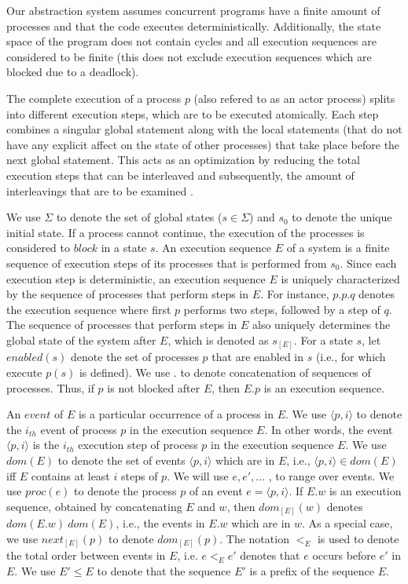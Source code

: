 Our abstraction system assumes concurrent programs have a finite amount of processes and that
the code executes deterministically. Additionally, the state space of the program does not
contain cycles and all execution sequences are considered to be finite (this does not exclude
execution sequences which are blocked due to a deadlock).

The complete execution of a process $p$ (also refered to as an actor process) splits into different execution steps, which are to be 
executed atomically. Each step combines a singular global statement along with the local statements
(that do not have any explicit affect on the state of other processes) that take place before the next
global statement. This acts as an optimization by reducing the total execution steps that can be
interleaved and subsequently, the amount of interleavings that are to be examined \cite{Godefroid:1997:MCP:263699.263717}. 

We use $\Sigma$ to denote the set of global states ($s\in\Sigma$) and $s_0$ to 
denote the unique initial state. If a process cannot continue, the execution 
of the processes is considered to $block$ in a state $s$.
An execution sequence $E$ of a system is a finite sequence of
execution steps of its processes that is performed from $s_0$. Since each execution step is 
deterministic, an execution sequence $E$ is uniquely characterized by the sequence of processes
that perform steps in $E$. For instance, $p.p.q$ denotes the execution
sequence where first $p$ performs two steps, followed by a step of $q$.
The sequence of processes that perform steps in $E$ also uniquely
determines the global state of the system after $E$, which is denoted as
$s_{[E]}$. For a state $s$, let $enabled(s)$ denote the set of processes $p$ that
are enabled in $s$ (i.e., for which execute $p(s)$ is defined). We use $.$ to
denote concatenation of sequences of processes. Thus, if $p$ is not
blocked after $E$, then $E.p$ is an execution sequence.

An $event$ of $E$ is a particular occurrence of a process in $E$.
We use $\langle p,i \rangle$ to denote the $i_{th}$ event of process $p$ in the execution
sequence $E$. In other words, the event $\langle p,i \rangle$ is the $i_{th}$ execution step
of process $p$ in the execution sequence $E$. We use $dom(E)$ to denote
the set of events $\langle p,i \rangle$ which are in $E$, i.e., $\langle p,i \rangle \in dom(E)$ iff $E$
contains at least $i$ steps of $p$. We will use $e,e',...$ , to range over
events. We use $proc(e)$ to denote the process $p$ of an event $e = \langle p, i \rangle$.
If $E.w$ is an execution sequence, obtained by concatenating $E$ and
$w$, then $dom_{[E]}(w)$ denotes $dom(E.w) \ dom(E)$, i.e., the events in
$E.w$ which are in $w$. As a special case, we use $next_{[E]}(p)$ to denote
$dom_{[E]}(p)$.
The notation $<_E$ is used to denote the total order between events in $E$, i.e.
$e <_E e'$  denotes that $e$ occurs before $e'$  in $E$. We use $E'\leq E$ to
denote that the sequence $E'$ is a prefix of the sequence $E$.

